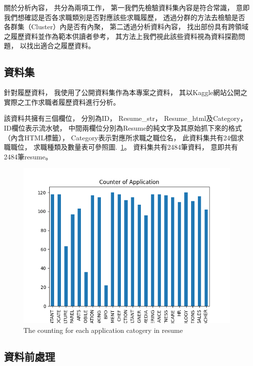 \documentclass[acmsmall]{acmart}
\begin{document}
關於分析內容，
共分為兩項工作，
第一我們先檢驗資料集內容是符合常識，
意即我們想確認是否各求職類別是否對應該些求職履歷，
透過分群的方法去檢驗是否各群集（Cluster）內是否有內聚，
第二透過分析資料內容，
找出部份具有跨領域之履歷資料並作為範本供讀者參考，
其方法上我們視此該些資料視為資料探勘問題\cite{han2011data}，
以找出適合之履歷資料。

\subsection{資料集}

針對履歷資料，
我使用了公開資料集作為本專案之資料，
其以Kaggle網站公開之實際之工作求職者履歷資料進行分析\cite{kaggle_dataset}。

該資料共擁有三個欄位，
分別為ID，
Resume\_str，
Resume\_html及Category，
ID欄位表示流水號，
中間兩欄位分別為Resume的純文字及其原始抓下來的格式（內含HTML標籤），
Category表示對應所求職之職位名，
此資料集共有24個求職職位，
求職種類及數量表可參照圖.~\ref{counter_of_application}。
資料集共有2484筆資料，
意即共有2484筆resume。

\begin{figure}
    \centerline{\includegraphics[width=1.0\textwidth]{counter_of_application.png}}
    \caption{The counting for each application catogery in resume}
    \label{counter_of_application}
\end{figure}

\subsection{資料前處理}
\end{document}
